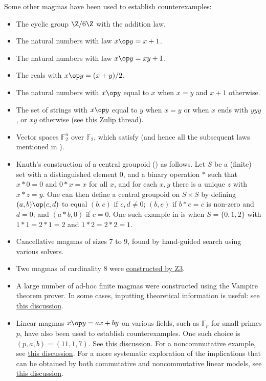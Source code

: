 Some other magmas have been used to establish counterexamples:
\begin{itemize}
  \item The cyclic group $\Z/6\Z$ with the addition law.
  \item The natural numbers with law $x \op y = x+1$.
  \item The natural numbers with law $x \op y = xy+1$.
  \item The reals with $x \op y = (x+y)/2$.
  \item The natural numbers with $x \op y$ equal to $x$ when $x=y$ and $x+1$ otherwise.
  \item The set of strings with $x \op y$ equal to $y$ when $x=y$ or when $x$ ends with $yyy$, or $xy$ otherwise (see \href{https://leanprover.zulipchat.com/#narrow/stream/458659-Equational/topic/3102.20does.20not.20imply.203176/near/474656031}{this Zulip thread}).
  \item Vector spaces ${\mathbb F}_2^n$ over ${\mathbb F}_2$, which satisfy  (and hence all the subsequent laws mentioned in ).
  \item Knuth's construction \cite{knuth} of a central groupoid () as follows.  Let $S$ be a (finite) set with a distinguished element $0$, and a binary operation $*$ such that $x*0=0$ and $0*x=x$   for all $x$, and for each $x,y$ there is a unique $z$ with $x*z=y$.  One can then define a central groupoid on $S \times S$ by defining $(a,b) \op (c,d)$ to equal $(b,c)$ if $c,d \neq 0$; $(b,e)$ if $b*e=c$ is non-zero and $d=0$; and $(a*b,0)$ if $c=0$.  One such example in \cite{knuth} is when $S = \{0,1,2\}$ with $1*1=2*1=2$ and $1*2=2*2=1$.
  \item Cancellative magmas of sizes 7 to 9, found by hand-guided search using various solvers.
  \item Two magmas of cardinality $8$ were \href{https://leanprover.zulipchat.com/#narrow/stream/458659-Equational/topic/using.20z3/near/474918100}{constructed by Z3}.
  \item A large number of ad-hoc finite magmas were constructed using the Vampire theorem prover.  In some cases, inputting theoretical information is useful: see \href{https://leanprover.zulipchat.com/#narrow/channel/458659-Equational/topic/Outstanding.20equations.2C.20v1/near/478066872}{this discussion}.
  \item Linear magmas $x\op y = ax+by$ on various fields, such as ${\mathbb F}_p$ for small primes $p$, have also been used to establish counterexamples.  One such choice is $(p,a,b) = (11,1,7)$. See \href{https://leanprover.zulipchat.com/#narrow/stream/458659-Equational/topic/An.20old.20new.20idea}{this discussion}.  For a noncommutative example, see \href{https://leanprover.zulipchat.com/#narrow/channel/458659-Equational/topic/Outstanding.20equations.2C.20v1/near/477928995.2E01}{this discussion}. For a more systematic exploration of the implications that can be obtained by both commutative and noncommutative linear models, see \href{https://leanprover.zulipchat.com/#narrow/channel/458659-Equational/topic/Non-commutative.20linear.20implications}{this discussion}.

\end{itemize}
